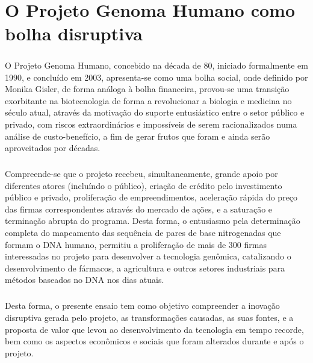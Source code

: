 \chapter*{O Projeto Genoma Humano como bolha disruptiva}

\paragraph{} O Projeto Genoma Humano, concebido na década de 80, iniciado formalmente em 1990, e concluído em 2003, apresenta-se como uma bolha social, onde definido por Monika Gisler, de forma análoga à bolha financeira, provou-se uma transição exorbitante na biotecnologia de forma a revolucionar a biologia e medicina no século atual, através da motivação do suporte entusiástico entre o setor público e privado, com riscos extraordinários e impossíveis de serem racionalizados numa análise de custo-benefício, a fim de gerar frutos que foram e ainda serão aproveitados por décadas.

\paragraph{} Compreende-se que o projeto recebeu, simultaneamente, grande apoio por diferentes atores (incluíndo o público), criação de crédito pelo investimento público e privado, proliferação de empreendimentos, aceleração rápida do preço das firmas correspondentes através do mercado de ações, e a saturação e terminação abrupta do programa. Desta forma, o entusiasmo pela determinação completa do mapeamento das sequência de pares de base nitrogenadas que formam o DNA humano, permitiu a proliferação de mais de 300 firmas interessadas no projeto para desenvolver a tecnologia genômica, catalizando o desenvolvimento de fármacos, a agricultura e outros setores industriais para métodos baseados no DNA nos dias atuais.

\paragraph{} Desta forma, o presente ensaio tem como objetivo compreender a inovação disruptiva gerada pelo projeto, as transformações causadas, as suas fontes, e a proposta de valor que levou ao desenvolvimento da tecnologia em tempo recorde, bem como os aspectos econômicos e sociais que foram alterados durante e após o projeto.


